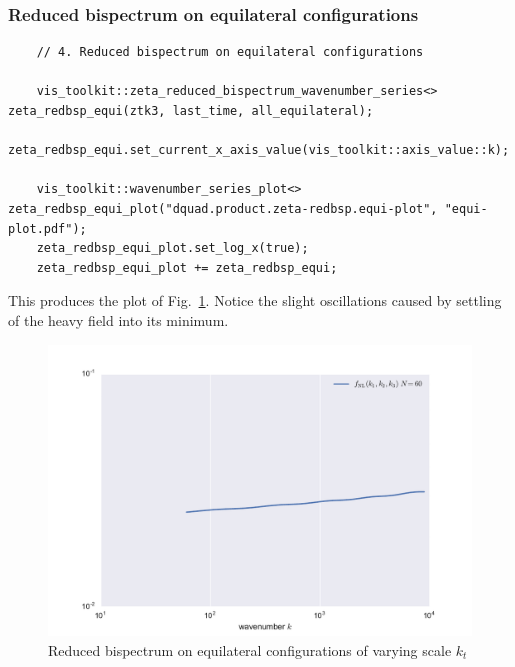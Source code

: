 \documentclass[11pt,a4paper]{article}
\begin{document}
\subsubsection{Reduced bispectrum on equilateral configurations}
\begin{verbatim}
    // 4. Reduced bispectrum on equilateral configurations

    vis_toolkit::zeta_reduced_bispectrum_wavenumber_series<> zeta_redbsp_equi(ztk3, last_time, all_equilateral);
    zeta_redbsp_equi.set_current_x_axis_value(vis_toolkit::axis_value::k);

    vis_toolkit::wavenumber_series_plot<> zeta_redbsp_equi_plot("dquad.product.zeta-redbsp.equi-plot", "equi-plot.pdf");
    zeta_redbsp_equi_plot.set_log_x(true);
    zeta_redbsp_equi_plot += zeta_redbsp_equi;
\end{verbatim}
This produces the plot of Fig.~\ref{fig:equi-plot}.
Notice the slight oscillations caused by settling of the heavy field
into its minimum.
\begin{figure}
    \begin{center}
        \includegraphics[scale=0.75]{Outputs/equi-plot}    
    \end{center}
    \caption{\label{fig:equi-plot}Reduced bispectrum on equilateral configurations of
    varying scale $k_t$}
\end{figure}
\end{document}
